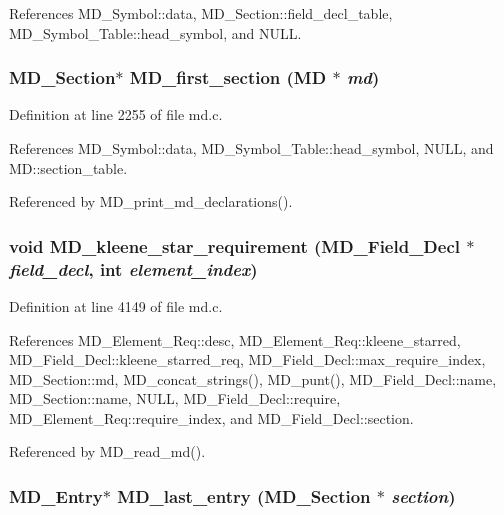 References MD\_\-Symbol::data, MD\_\-Section::field\_\-decl\_\-table, MD\_\-Symbol\_\-Table::head\_\-symbol, and NULL.
\subsubsection{\setlength{\rightskip}{0pt plus 5cm}\bf{MD\_\-Section}$\ast$ MD\_\-first\_\-section (\bf{MD} $\ast$ {\em md})}\label{md_8h_80898363bd87b2073facc7280db90304}




Definition at line 2255 of file md.c.

References MD\_\-Symbol::data, MD\_\-Symbol\_\-Table::head\_\-symbol, NULL, and MD::section\_\-table.

Referenced by MD\_\-print\_\-md\_\-declarations().
\subsubsection{\setlength{\rightskip}{0pt plus 5cm}void MD\_\-kleene\_\-star\_\-requirement (\bf{MD\_\-Field\_\-Decl} $\ast$ {\em field\_\-decl}, int {\em element\_\-index})}\label{md_8h_b337c713035473e4b06c4125538f2a99}




Definition at line 4149 of file md.c.

References MD\_\-Element\_\-Req::desc, MD\_\-Element\_\-Req::kleene\_\-starred, MD\_\-Field\_\-Decl::kleene\_\-starred\_\-req, MD\_\-Field\_\-Decl::max\_\-require\_\-index, MD\_\-Section::md, MD\_\-concat\_\-strings(), MD\_\-punt(), MD\_\-Field\_\-Decl::name, MD\_\-Section::name, NULL, MD\_\-Field\_\-Decl::require, MD\_\-Element\_\-Req::require\_\-index, and MD\_\-Field\_\-Decl::section.

Referenced by MD\_\-read\_\-md().
\subsubsection{\setlength{\rightskip}{0pt plus 5cm}\bf{MD\_\-Entry}$\ast$ MD\_\-last\_\-entry (\bf{MD\_\-Section} $\ast$ {\em section})}\label{md_8h_15e07021cd847b69992db2c5f4bc0f4e}




